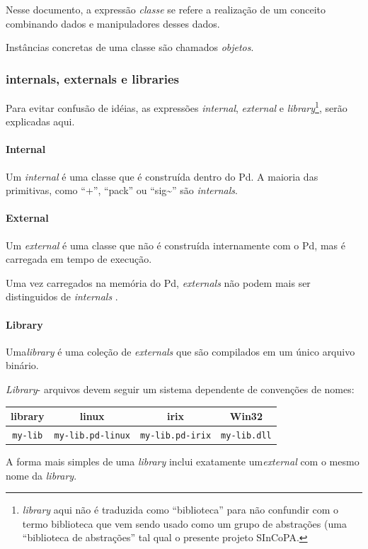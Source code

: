 \documentclass{ppgmus}
\begin{document}
Nesse documento, a expressão {\em classe} se refere a realização de um
conceito combinando dados e manipuladores desses dados.

Instâncias concretas de uma classe são chamados {\em objetos}.

\subsubsection{internals, externals e libraries}

Para evitar confusão de idéias, as expressões {\em internal}, {\em external} e
{\em library}\footnote{{\em library} aqui não é traduzida como ``biblioteca'' 
para não confundir com o termo biblioteca que vem sendo usado como um grupo
de abstrações (uma ``biblioteca de abstrações'' tal qual o presente projeto
SInCoPA.}, serão explicadas aqui.

\paragraph{Internal}
Um {\em internal} é uma classe que é construída dentro do Pd.
A maioria das primitivas, como ``+'', ``pack'' ou ``sig\~\/'' são {\em internals}. 


\paragraph{External}
Um {\em external} é uma classe que não é construída internamente com o Pd, mas 
é carregada em tempo de execução.

Uma vez carregados na memória do Pd, {\em externals} não podem mais ser distinguidos
de {\em internals} .

\paragraph{Library}
Uma{\em library} é uma coleção de {\em externals} que são compilados em um único
arquivo binário.

{\em Library}- arquivos devem seguir um sistema dependente de convenções de nomes:

\begin{tabular}{c||c|c|c}
library & linux&irix&Win32 \\
\hline
{\tt my-lib}&{\tt  my-lib.pd-linux}&{\tt  my-lib.pd-irix}&
{\tt  my-lib.dll}\\
\end{tabular}

A forma mais simples de uma {\em library} inclui exatamente um{\em external}
com o mesmo nome da {\em library}.
\end{document}
